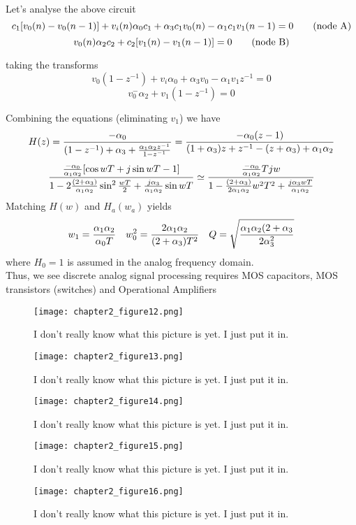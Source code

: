 \documentclass[11pt,fleqn]{book} %
\begin{document}
Let's analyse the above circuit
\begin{equation}
 c_1[v_0(n)-v_0(n-1)]+v_i(n)\alpha_0c_1+\alpha_3c_1v_0(n)-\alpha_1c_1v_1(n-1)=0 \tag{\text{node A}}
\end{equation}
\begin{equation}
 v_0(n)\alpha_2c_2+c_2[v_1(n)-v_1(n-1)]=0 \tag{\text{node B}}
\end{equation}

taking the transforms
$$v_0(1-z^{-1})+v_i\alpha_0+\alpha_3v_0-\alpha_1v_1z^{-1}=0$$
$$v_0^-\alpha_2+v_1(1-z^{-1})=0$$

Combining the equations (eliminating $v_1$) we have
$$H(z)={-\alpha_0\over (1-z^{-1})+\alpha_3+{\alpha_1\alpha_2z^{-1}\over 1-z^{-1}}}={-\alpha_0(z-1)\over (1+\alpha_3)z+z^{-1}-(z+\alpha_3)+\alpha_1\alpha_2}$$
$${{-\alpha_0\over \alpha_1\alpha_2}[\cos wT+j\sin wT-1]\over 1-2{(2+\alpha_3)\over\alpha_1\alpha_2}\sin^2{wT\over2}+{j\alpha_3\over\alpha_1\alpha_2}\sin wT}\simeq{{-\alpha_0\over \alpha_1\alpha_2}Tjw\over 1-{(2+\alpha_3)\over2\alpha_1\alpha_2}w^2T^2+{j\alpha_3wT\over \alpha_1\alpha_2}}$$
Matching $H(w)$ and $H_a(w_a)$ yields
$$w_1={\alpha_1\alpha_2\over\alpha_0T}\quad w_0^2={2\alpha_1\alpha_2\over(2+\alpha_3)T^2}\quad Q=\sqrt{\alpha_1\alpha_2(2+\alpha_3\over2\alpha_3^2}$$
where $H_0=1$ is assumed in the analog frequency domain.\\
Thus, we see discrete analog signal processing requires  MOS capacitors, MOS transistors (switches) and Operational Amplifiers

\begin{figure}[h]
  \centering\texttt{[image: chapter2\_figure12.png]}
  \caption{I don't really know what this picture is yet. I just put it in.}
\end{figure}
\begin{figure}[h]
  \centering\texttt{[image: chapter2\_figure13.png]}
  \caption{I don't really know what this picture is yet. I just put it in.}
\end{figure}
\begin{figure}[h]
  \centering\texttt{[image: chapter2\_figure14.png]}
  \caption{I don't really know what this picture is yet. I just put it in.}
\end{figure}
\begin{figure}[h]
  \centering\texttt{[image: chapter2\_figure15.png]}
  \caption{I don't really know what this picture is yet. I just put it in.}
\end{figure}
\begin{figure}[h]
  \centering\texttt{[image: chapter2\_figure16.png]}
  \caption{I don't really know what this picture is yet. I just put it in.}
\end{figure}
\end{document}
